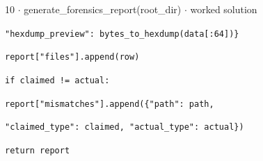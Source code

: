 \documentclass[11pt]{article}
\begin{document}
\begin{keepsection}
\begin{workedbox}{10 \ensuremath{\cdot} generate\_forensics\_report(root\_dir) \ensuremath{\cdot} worked solution}
\begin{enumerate}
\begin{tcolorbox}[colback=Paperblue,colframe=Paperblue,boxrule=0pt,arc=0pt,left=7pt,right=7pt,top=5pt,bottom=5pt]
\noindent\hspace*{6em}\texttt{"hexdump\_preview": bytes\_to\_hexdump(data[:64])\}}\par
\noindent\hspace*{3em}\texttt{report["files"].append(row)}\par
\noindent\hspace*{3em}\texttt{if claimed != actual:}\par
\noindent\hspace*{5em}\texttt{report["mismatches"].append(\{"path": path,}\par
\noindent\hspace*{7em}\texttt{"claimed\_type": claimed, "actual\_type": actual\})}\par
\noindent\hspace*{0em}\texttt{return report}\par
\end{tcolorbox}
\end{enumerate}
\end{workedbox}

\end{keepsection}
\end{document}
